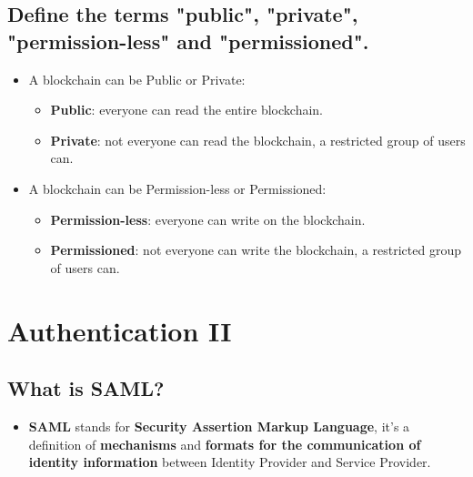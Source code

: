 \documentclass[9pt, letterpaper]{article}
\begin{document}
\subsection{Define the terms "public", "private", "permission-less" and "permissioned".}
\begin{itemize}
	\item A blockchain can be Public or Private:
	      \begin{itemize}
		      \item \textbf{Public}: everyone can read the entire blockchain.
		      \item \textbf{Private}: not everyone can read the blockchain, a restricted group of users can.
	      \end{itemize}
	\item A blockchain can be Permission-less or Permissioned:
	      \begin{itemize}
		      \item \textbf{Permission-less}: everyone can write on the blockchain.
		      \item \textbf{Permissioned}: not everyone can write the blockchain, a restricted group of users can.
	      \end{itemize}
\end{itemize}

\section{Authentication II}

\subsection{What is SAML?}
\begin{itemize}
	\item \textbf{SAML} stands for \textbf{Security Assertion Markup Language}, it's a definition of \textbf{mechanisms} and \textbf{formats for the communication of identity information} between Identity Provider and Service Provider.
\end{itemize}
\end{document}
